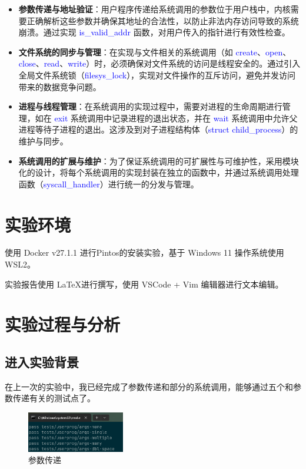 \documentclass[14pt,a4paper,UTF8,twoside]{article}
\renewcommand{\texttt}[1]{\textcolor{blue}{\ttfamily #1}}
\begin{document}
\begin{itemize}
    \item \textbf{参数传递与地址验证}：用户程序传递给系统调用的参数位于用户栈中，内核需要正确解析这些参数并确保其地址的合法性，以防止非法内存访问导致的系统崩溃。通过实现 \texttt{is\_valid\_addr} 函数，对用户传入的指针进行有效性检查。
    
    \item \textbf{文件系统的同步与管理}：在实现与文件相关的系统调用（如 \texttt{create}、\texttt{open}、\texttt{close}、\texttt{read}、\texttt{write}）时，必须确保对文件系统的访问是线程安全的。通过引入全局文件系统锁（\texttt{filesys\_lock}），实现对文件操作的互斥访问，避免并发访问带来的数据竞争问题。
    
    \item \textbf{进程与线程管理}：在系统调用的实现过程中，需要对进程的生命周期进行管理，如在 \texttt{exit} 系统调用中记录进程的退出状态，并在 \texttt{wait} 系统调用中允许父进程等待子进程的退出。这涉及到对子进程结构体（\texttt{struct child\_process}）的维护与同步。
    
    \item \textbf{系统调用的扩展与维护}：为了保证系统调用的可扩展性与可维护性，采用模块化的设计，将每个系统调用的实现封装在独立的函数中，并通过系统调用处理函数（\texttt{syscall\_handler}）进行统一的分发与管理。
\end{itemize}

\section{实验环境}

使用 Docker v27.1.1 进行Pintos的安装实验，基于 Windows 11 操作系统使用 WSL2。

实验报告使用 \LaTeX 进行撰写，使用 VSCode + Vim 编辑器进行文本编辑。

\section{实验过程与分析}

\subsection{进入实验背景}

在上一次的实验中，我已经完成了参数传递和部分的系统调用，能够通过五个和参数传递有关的测试点了。

\begin{figure}[H]
    \centering
    \includegraphics[width=0.38\textwidth]{img6/pass.png}
    \caption{参数传递}
    \label{fig:lab6-1}
\end{figure}
\end{document}
